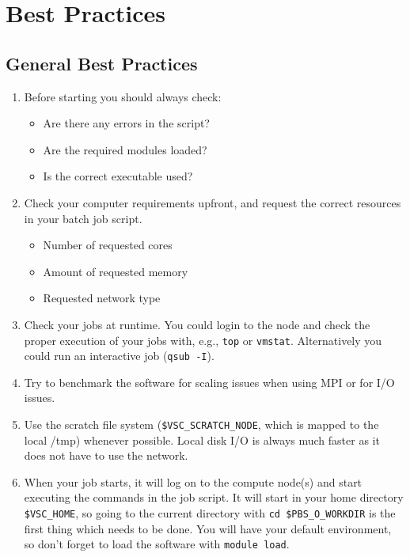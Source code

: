 \chapter{Best Practices}
\label{ch:best-practices}

\section{General Best Practices}
\label{sec:general-best-practices}
\begin{enumerate}

  \item  Before starting you should always check:
  \begin{itemize}
    \item  Are there any errors in the script?
    \item  Are the required modules loaded?
    \item  Is the correct executable used?
\end{itemize}

  \item  Check your computer requirements upfront, and request the correct resources in your batch job script.
  \begin{itemize}
    \item  Number of requested cores
    \item  Amount of requested memory
    \item  Requested network type
\end{itemize}

  \item  Check your jobs at runtime. You could login to the node and check the
    proper execution of your jobs with, e.g., \verb|top| or \verb|vmstat|.
    Alternatively you could run an interactive job (\verb|qsub -I|).

  \item  Try to benchmark the software for scaling issues when using MPI or for
    I/O issues.

  \item  Use the scratch file system (\verb|$VSC_SCRATCH_NODE|, which is mapped to the
    local /tmp) whenever possible. Local disk I/O is always much faster as it
    does not have to use the network.

  \item  When your job starts, it will log on to the compute node(s) and start
    executing the commands in the job script. It will start in your home
    directory \verb|$VSC_HOME|, so going to the current directory with
    \verb|cd $PBS_O_WORKDIR| is the first thing which needs to be done.  You will
    have your default environment, so don't forget to load the software with
    \verb|module load|.


\end{enumerate}
